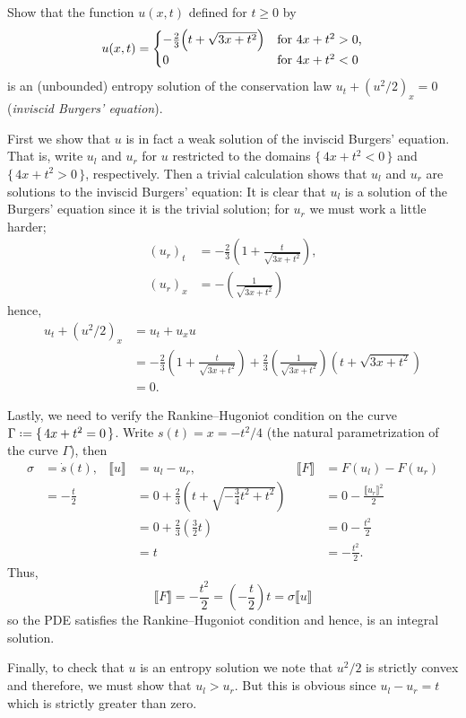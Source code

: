 \begin{problem}
  Show that the function \(u(x,t)\) defined for \(t\geq 0\) by
  \[
    u(x,t)=
    \begin{cases}
      -\frac{2}{3}\Bigl(t+\sqrt{3x+t^2}\Bigr)
      &\text{for \(4x+t^2>0\),}\\
      0
      &\text{for \(4x+t^2<0\)}
    \end{cases}
  \]
  is an (unbounded) entropy solution of the conservation law
  \(u_t+(u^2/2)_x=0\) (\emph{inviscid Burgers' equation}).
\end{problem}
\begin{solution*}
  First we show that \(u\) is in fact a weak solution of the inviscid
  Burgers' equation. That is, write \(u_l\) and \(u_r\) for \(u\)
  restricted to the domains \(\{\,4x+t^2<0\,\}\) and \(\{\,4x+t^2>0\,\}\),
  respectively. Then a trivial calculation shows that \(u_l\) and \(u_r\)
  are solutions to the inviscid Burgers' equation: It is clear that \(u_l\)
  is a solution of the Burgers' equation since it is the trivial solution;
  for \(u_r\) we must work a little harder;
  \begin{align*}
    {(u_r)}_t&=-\frac{2}{3}\left(1+\frac{t}{\sqrt{3x+t^2}}\right),\\
    {(u_r)}_x&=-\left(\frac{1}{\sqrt{3x+t^2}}\right)
  \end{align*}
  hence,
  \begin{align*}
    u_t+(u^2/2)_x
    &=u_t+u_xu\\
    &=-\frac{2}{3}\left(1+\frac{t}{\sqrt{3x+t^2}}\right)
      +\frac{2}{3}
      \left(\frac{1}{\sqrt{3x+t^2}}\right)\left(t+\sqrt{3x+t^2}\right)\\
    &=0.
  \end{align*}

  Lastly, we need to verify the Rankine--Hugoniot condition on the curve
  \(\Gamma\defeq \{\,4x+t^2=0\,\}\). Write \(s(t)=x=-t^2/4\) (the natural
  parametrization of the curve \(\Gamma\)), then
  \begin{align*}
    \sigma&=\dot s(t),
    &\llbracket u\rrbracket
    &=u_l-u_r,
    &\llbracket F\rrbracket
    &=F(u_l)-F(u_r)\\
          &=-\frac{t}{2}
    &&=0+\frac{2}{3}\left(t+\sqrt{-\frac{3}{4}t^2+t^2}\right)
    &&=0-\frac{\llbracket u_r\rrbracket^2}{2}\\
          &&
    &=0+\frac{2}{3}\left(\frac{3}{2}t\right)
    &&=0-\frac{t^2}{2}
    \\
          &&&=t&&=-\frac{t^2}{2}.
  \end{align*}
  Thus,
  \[
    \llbracket
    F\rrbracket=-\frac{t^2}{2}=\left(-\frac{t}{2}\right)t=\sigma\llbracket
    u\rrbracket
  \]
  so the PDE satisfies the Rankine--Hugoniot condition and hence, is an
  integral solution.

  Finally, to check that \(u\) is an entropy solution we note that
  \(u^2/2\) is strictly convex and therefore, we must show that
  \(u_l>u_r\). But this is obvious since \(u_l-u_r=t\) which is strictly
  greater than zero.
\end{solution*}

